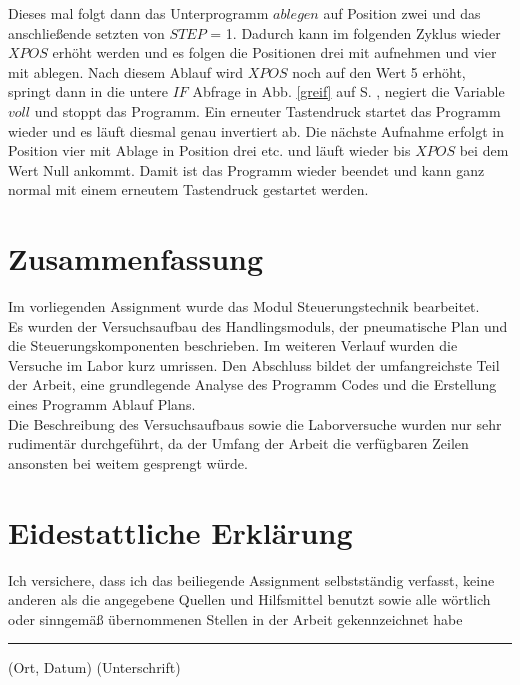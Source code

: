\documentclass[12pt,a4paper]{scrartcl}	%
\begin{document}
Dieses mal folgt dann das Unterprogramm $ablegen$ auf Position zwei und das anschließende setzten von $STEP$ = 1. Dadurch kann im folgenden Zyklus wieder $XPOS$ erhöht werden und es folgen die Positionen drei mit aufnehmen und vier mit ablegen. Nach diesem Ablauf wird $XPOS$ noch auf den Wert 5 erhöht, springt dann in die untere $IF$ Abfrage in Abb. \ref{greif} auf S. \pageref{greif}, negiert die Variable $voll$ und stoppt das Programm. Ein erneuter Tastendruck startet das Programm wieder und es läuft diesmal genau invertiert ab. Die nächste Aufnahme erfolgt in Position vier mit Ablage in Position drei etc. und läuft wieder bis $XPOS$ bei dem Wert Null ankommt. Damit ist das Programm wieder beendet und kann ganz normal mit einem erneutem Tastendruck gestartet werden.

\section{Zusammenfassung}
Im vorliegenden Assignment wurde das Modul Steuerungstechnik bearbeitet.\\
Es wurden der Versuchsaufbau des Handlingsmoduls, der pneumatische Plan und die Steuerungskomponenten beschrieben. Im weiteren Verlauf wurden die Versuche im Labor kurz umrissen. Den Abschluss bildet der umfangreichste Teil der Arbeit, eine grundlegende Analyse des Programm Codes und  die Erstellung eines Programm Ablauf Plans.\\
Die Beschreibung des Versuchsaufbaus sowie die Laborversuche wurden nur sehr rudimentär durchgeführt, da der Umfang der Arbeit die verfügbaren Zeilen ansonsten bei weitem gesprengt würde.
\newpage

\printbibliography
\newpage
\section{Eidestattliche Erklärung}
\vspace{4cm}
Ich versichere, dass ich das beiliegende Assignment selbstständig verfasst, keine anderen als die angegebene Quellen
und Hilfsmittel benutzt sowie alle wörtlich oder sinngemäß übernommenen Stellen in der Arbeit gekennzeichnet habe\\
\vspace{4cm}
\hrule
\vspace{0,4cm}
(Ort, Datum)
\hspace{9,5cm}
(Unterschrift)
\end{document}
